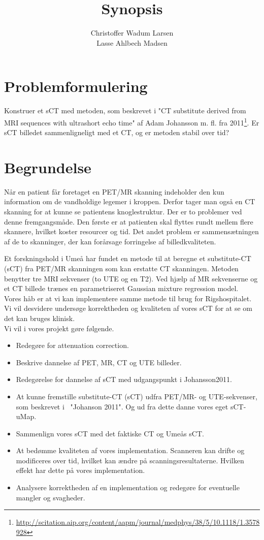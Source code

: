 \documentclass[12pt]{article}
\title{Synopsis}
\author{
Christoffer Wadum Larsen\\
Lasse Ahlbech Madsen}
\begin{document}
\maketitle


\section*{Problemformulering}
Konstruer et sCT med metoden, som beskrevet i "CT substitute derived from 
MRI sequences with ultrashort echo time" af Adam Johansson m. fl. fra 2011\footnote{\url{http://scitation.aip.org/content/aapm/journal/medphys/38/5/10.1118/1.3578928}}.
Er sCT billedet sammenligneligt med et CT, og er metoden stabil over tid?

\section*{Begrundelse}
Når en patient får foretaget en PET/MR skanning indeholder den kun
information om de vandholdige legemer i kroppen. Derfor tager man også en
CT skanning for at kunne se patientens knoglestruktur. Der er to problemer
ved denne fremgangsmåde. Den første er at patienten skal flyttes rundt
mellem flere skannere, hvilket koster resourcer og tid. Det andet problem
er sammensætningen af de to skanninger, der kan forårsage forringelse af
billedkvaliteten.

Et forskningshold i Umeå har fundet en metode til at beregne et
substitute-CT (sCT) fra PET/MR skanningen som kan erstatte CT skanningen.
Metoden benytter tre MRI sekvenser (to UTE og en T2). Ved hjælp af MR sekvenserne
og et CT billede trænes en parametriseret Gaussian mixture regression model.\\

Vores håb er at vi kan implementere samme metode til brug for Rigshospitalet.
Vi vil desvidere undersøge korrektheden og kvaliteten af vores sCT for at se
om det kan bruges klinisk.\\

Vi vil i vores projekt gøre følgende.
\begin{itemize}
    \item Redegøre for attenuation correction.
    \item Beskrive dannelse af PET, MR, CT og UTE billeder.
    \item Redegørelse for dannelse af sCT med udgangspunkt i Johansson2011.
    \item At kunne fremstille substitute-CT (sCT) udfra PET/MR- og
        UTE-sekvenser,
        som beskrevet i ~"Johanson 2011". Og ud fra dette danne vores eget 
        sCT-uMap.
    \item Sammenlign vores sCT med det faktiske CT og Umeås sCT.
    \item At bedømme kvaliteten af vores implementation. 
Scanneren kan drifte og modificeres over tid, hvilket kan ændre på
scanningsresultaterne. Hvilken effekt har dette på vores implementation.
    \item Analysere korrektheden af en implementation og redegøre for
        eventuelle mangler og svagheder.
\end{itemize}
\end{document}
